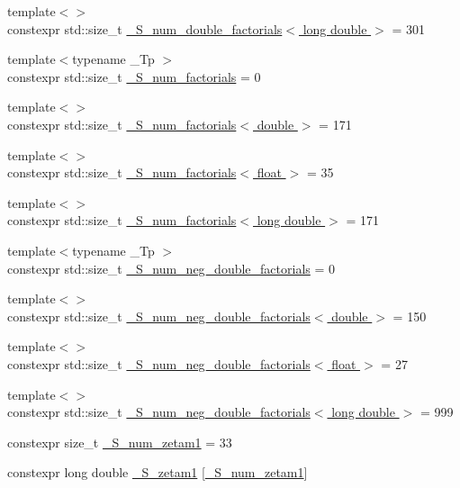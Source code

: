 \begin{DoxyCompactItemize}
{\footnotesize template$<$$>$ }\\constexpr std\+::size\+\_\+t \hyperlink{namespacestd_1_1____detail_a46272d8c219cfca2054da99471ed3711}{\+\_\+\+S\+\_\+num\+\_\+double\+\_\+factorials$<$ long double $>$} = 301
\item 
{\footnotesize template$<$typename \+\_\+\+Tp $>$ }\\constexpr std\+::size\+\_\+t \hyperlink{namespacestd_1_1____detail_a671f3ba94c1b06be87992486bca37426}{\+\_\+\+S\+\_\+num\+\_\+factorials} = 0
\item 
{\footnotesize template$<$$>$ }\\constexpr std\+::size\+\_\+t \hyperlink{namespacestd_1_1____detail_ad415b9ec36471d7aca4ebcd22cb7b216}{\+\_\+\+S\+\_\+num\+\_\+factorials$<$ double $>$} = 171
\item 
{\footnotesize template$<$$>$ }\\constexpr std\+::size\+\_\+t \hyperlink{namespacestd_1_1____detail_a3a29651303ca2222246ef6f0a17e92ec}{\+\_\+\+S\+\_\+num\+\_\+factorials$<$ float $>$} = 35
\item 
{\footnotesize template$<$$>$ }\\constexpr std\+::size\+\_\+t \hyperlink{namespacestd_1_1____detail_ab90b8eb39ff963a5ed533a3be0b7f7fd}{\+\_\+\+S\+\_\+num\+\_\+factorials$<$ long double $>$} = 171
\item 
{\footnotesize template$<$typename \+\_\+\+Tp $>$ }\\constexpr std\+::size\+\_\+t \hyperlink{namespacestd_1_1____detail_ac386f200e589ce1fc895c2aac0e47f8c}{\+\_\+\+S\+\_\+num\+\_\+neg\+\_\+double\+\_\+factorials} = 0
\item 
{\footnotesize template$<$$>$ }\\constexpr std\+::size\+\_\+t \hyperlink{namespacestd_1_1____detail_a2d14a1207a6fea22f32586dfd41cf49d}{\+\_\+\+S\+\_\+num\+\_\+neg\+\_\+double\+\_\+factorials$<$ double $>$} = 150
\item 
{\footnotesize template$<$$>$ }\\constexpr std\+::size\+\_\+t \hyperlink{namespacestd_1_1____detail_a3ce62e66e9a196fd89b4d841f7374d68}{\+\_\+\+S\+\_\+num\+\_\+neg\+\_\+double\+\_\+factorials$<$ float $>$} = 27
\item 
{\footnotesize template$<$$>$ }\\constexpr std\+::size\+\_\+t \hyperlink{namespacestd_1_1____detail_a2ef051ec96e521e71489d2327d11c22a}{\+\_\+\+S\+\_\+num\+\_\+neg\+\_\+double\+\_\+factorials$<$ long double $>$} = 999
\item 
constexpr size\+\_\+t \hyperlink{namespacestd_1_1____detail_a807e36c2aec3a9f27fdb21726cd464e2}{\+\_\+\+S\+\_\+num\+\_\+zetam1} = 33
\item 
constexpr long double \hyperlink{namespacestd_1_1____detail_a22ed80d9e5c3bc79e61a3cdb8e79a462}{\+\_\+\+S\+\_\+zetam1} \mbox{[}\hyperlink{namespacestd_1_1____detail_a807e36c2aec3a9f27fdb21726cd464e2}{\+\_\+\+S\+\_\+num\+\_\+zetam1}\mbox{]}
\end{DoxyCompactItemize}


